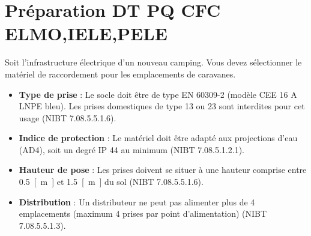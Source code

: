 \documentclass[a4paper,11pt,answers,addpoints]{exam}
\begin{document}
	\unframedsolutions
	\pointsinmargin
	\bracketedpoints
	
\section*{Préparation DT PQ CFC ELMO,IELE,PELE}
\begin{questions}
\question
Soit l'infrastructure électrique d'un nouveau camping. Vous devez sélectionner le matériel de raccordement pour les emplacements de caravanes.

\begin{solution}
	\begin{itemize}
		\item \textbf{Type de prise} : Le socle doit être de type EN 60309-2 (modèle CEE 16 A LNPE bleu). Les prises domestiques de type 13 ou 23 sont interdites pour cet usage (NIBT 7.08.5.5.1.6).
		\item \textbf{Indice de protection} : Le matériel doit être adapté aux projections d'eau (AD4), soit un degré IP 44 au minimum (NIBT 7.08.5.1.2.1).
		\item \textbf{Hauteur de pose} : Les prises doivent se situer à une hauteur comprise entre \qty{0.5}{[m]} et \qty{1.5}{[m]} du sol (NIBT 7.08.5.5.1.6).
		\item \textbf{Distribution} : Un distributeur ne peut pas alimenter plus de 4 emplacements (maximum 4 prises par point d'alimentation) (NIBT 7.08.5.5.1.3).
	\end{itemize}
	

\end{solution}
\end{questions}
\end{document}
